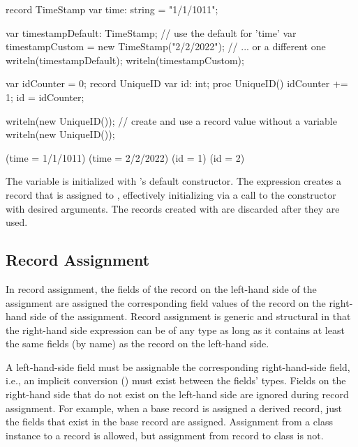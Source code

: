 \begin{example}
\begin{chapelpre}
\end{chapelpre}
\begin{chapel}
record TimeStamp {
  var time: string = "1/1/1011";
}

var timestampDefault: TimeStamp;                  // use the default for 'time'
var timestampCustom = new TimeStamp("2/2/2022");  // ... or a different one
writeln(timestampDefault);
writeln(timestampCustom);

var idCounter = 0;
record UniqueID {
  var id: int;
  proc UniqueID() { idCounter += 1; id = idCounter; }
}

writeln(new UniqueID());  // create and use a record value without a variable
writeln(new UniqueID());
\end{chapel}
\begin{chapeloutput}
(time = 1/1/1011)
(time = 2/2/2022)
(id = 1)
(id = 2)
\end{chapeloutput}
The variable  is initialized with 's default constructor. The  expression creates a record that is assigned to , effectively initializing  via a call to the constructor with desired arguments. The records created with  are discarded after they are used.
\end{example}

\subsection{Record Assignment}
\label{Record_Assignment}

In record assignment, the fields of the record on the left-hand side
of the assignment are assigned the corresponding field values of the record
on the right-hand side of the assignment.
Record assignment is generic and structural in that the
right-hand side expression can be of any type as long as it
contains at least the same fields (by name) as the record on the left-hand
side.

A left-hand-side field must be assignable the corresponding
right-hand-side field, i.e., an implicit conversion
() must exist between the fields' types.
Fields on the right-hand side that do not exist on the left-hand side
are ignored during record assignment.  For example, when a base record is
assigned a derived record, just the fields that exist in the base
record are assigned.
Assignment from a class instance to a record is allowed, but assignment
from record to class is not.

